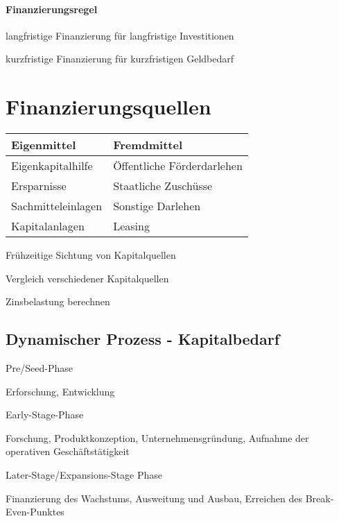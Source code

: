 \paragraph{Finanzierungsregel}
\begin{compactitem}
	\item langfristige Finanzierung für langfristige Investitionen
	\item kurzfristige Finanzierung für kurzfristigen Geldbedarf
\end{compactitem}

\clearpage
\section{Finanzierungsquellen}
\begin{tabular}{l|l}
	{\bf Eigenmittel} & {\bf Fremdmittel}\\\hline
	Eigenkapitalhilfe & Öffentliche Förderdarlehen\\
	Ersparnisse & Staatliche Zuschüsse\\
	Sachmitteleinlagen & Sonstige Darlehen\\
	Kapitalanlagen & Leasing\\
\end{tabular}
\begin{compactitem}
	\item Frühzeitige Sichtung von Kapitalquellen
	\item Vergleich verschiedener Kapitalquellen
	\item Zinsbelastung berechnen
\end{compactitem}

\clearpage
\subsection{Dynamischer Prozess - Kapitalbedarf}
\begin{compactitem}
	\item Pre/Seed-Phase
	\begin{compactitem}
		\item Erforschung, Entwicklung
	\end{compactitem}
	\item Early-Stage-Phase
	\begin{compactitem}
		\item Forschung, Produktkonzeption, Unternehmensgründung, Aufnahme der operativen Geschäftstätigkeit
	\end{compactitem}
	\item Later-Stage/Expansions-Stage Phase
	\begin{compactitem}
		\item Finanzierung des Wachstums, Ausweitung und Ausbau, Erreichen des Break-Even-Punktes
	\end{compactitem}
\end{compactitem}

